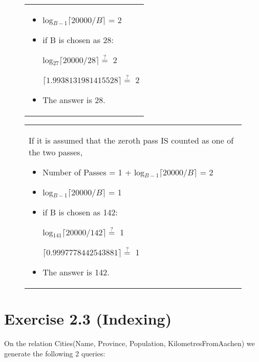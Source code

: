 \documentclass[10pt]{article}
\begin{document}
\begin{enumerate}
\begin{figure}[!htb]
\begin{minipage}{0.5\textwidth}
\begin{tabular}{p{}}
\begin{itemize}
								\item log$_{B-1} \lceil {20000} / {B} \rceil$ = 2
								
								\item if B is chosen as 28:
								
								log$_{27} \lceil {20000} / {28} \rceil \stackrel{?}{=} $ 2
								
								$ \lceil 1.9938131981415528 \rceil \stackrel{?}{=} $ 2
								
								\item The answer is 28.
							\end{itemize}
						\end{tabular}
					\end{minipage}%
					\begin{minipage}{0.5\textwidth}
						\begin{tabular}{|p{}}
							If it is assumed that the zeroth pass IS counted as one of the two passes,
							
							\begin{itemize}
								\item Number of Passes = 1 + log$_{B-1} \lceil {20000} / {B} \rceil$ = 2
								
								\item log$_{B-1} \lceil {20000} / {B} \rceil$ = 1
								
								\item if B is chosen as 142:
								
								log$_{141} \lceil {20000} / {142} \rceil \stackrel{?}{=} $ 1
								
								$ \lceil 0.9997778442543881 \rceil \stackrel{?}{=} $ 1
								
								\item The answer is 142.
							\end{itemize}
						\end{tabular}
					\end{minipage}
				\end{figure}
				
			
		\end{enumerate}
		
	\clearpage
		
	\section*{Exercise 2.3 (Indexing)}
	
		On the relation Cities(Name, Province, Population, KilometresFromAachen) we generate the following 2 queries:
		
\end{document}
